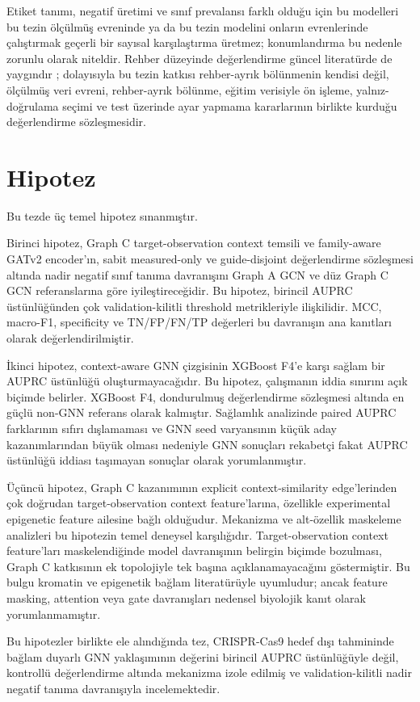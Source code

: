 Etiket tanımı, negatif üretimi ve sınıf prevalansı farklı olduğu için bu modelleri bu tezin ölçülmüş evreninde ya da bu tezin modelini onların evrenlerinde çalıştırmak geçerli bir sayısal karşılaştırma üretmez; konumlandırma bu nedenle zorunlu olarak niteldir. Rehber düzeyinde değerlendirme güncel literatürde de yaygındır ; dolayısıyla bu tezin katkısı rehber-ayrık bölünmenin kendisi değil, ölçülmüş veri evreni, rehber-ayrık bölünme, eğitim verisiyle ön işleme, yalnız-doğrulama seçimi ve test üzerinde ayar yapmama kararlarının birlikte kurduğu değerlendirme sözleşmesidir.

\section{Hipotez}

Bu tezde üç temel hipotez sınanmıştır.

Birinci hipotez, Graph C target-observation context temsili ve family-aware GATv2 encoder'ın, sabit measured-only ve guide-disjoint değerlendirme sözleşmesi altında nadir negatif sınıf tanıma davranışını Graph A GCN ve düz Graph C GCN referanslarına göre iyileştireceğidir. Bu hipotez, birincil AUPRC üstünlüğünden çok validation-kilitli threshold metrikleriyle ilişkilidir. MCC, macro-F1, specificity ve TN/FP/FN/TP değerleri bu davranışın ana kanıtları olarak değerlendirilmiştir.

İkinci hipotez, context-aware GNN çizgisinin XGBoost F4'e karşı sağlam bir AUPRC üstünlüğü oluşturmayacağıdır. Bu hipotez, çalışmanın iddia sınırını açık biçimde belirler. XGBoost F4, dondurulmuş değerlendirme sözleşmesi altında en güçlü non-GNN referans olarak kalmıştır. Sağlamlık analizinde paired AUPRC farklarının sıfırı dışlamaması ve GNN seed varyansının küçük aday kazanımlarından büyük olması nedeniyle GNN sonuçları rekabetçi fakat AUPRC üstünlüğü iddiası taşımayan sonuçlar olarak yorumlanmıştır.

Üçüncü hipotez, Graph C kazanımının explicit context-similarity edge'lerinden çok doğrudan target-observation context feature'larına, özellikle experimental epigenetic feature ailesine bağlı olduğudur. Mekanizma ve alt-özellik maskeleme analizleri bu hipotezin temel deneysel karşılığıdır. Target-observation context feature'ları maskelendiğinde model davranışının belirgin biçimde bozulması, Graph C katkısının ek topolojiyle tek başına açıklanamayacağını göstermiştir. Bu bulgu kromatin ve epigenetik bağlam literatürüyle uyumludur; ancak feature masking, attention veya gate davranışları nedensel biyolojik kanıt olarak yorumlanmamıştır.

Bu hipotezler birlikte ele alındığında tez, CRISPR-Cas9 hedef dışı tahmininde bağlam duyarlı GNN yaklaşımının değerini birincil AUPRC üstünlüğüyle değil, kontrollü değerlendirme altında mekanizma izole edilmiş ve validation-kilitli nadir negatif tanıma davranışıyla incelemektedir.
